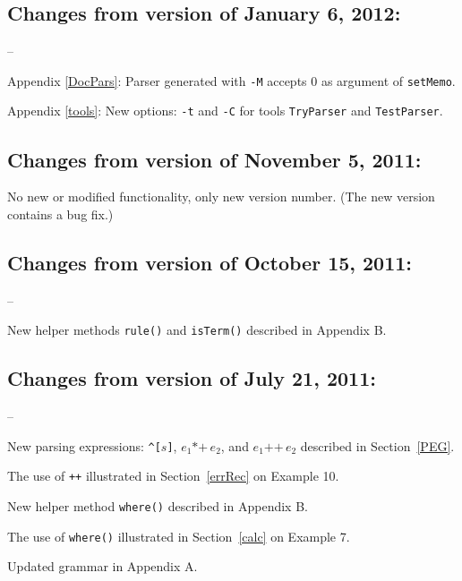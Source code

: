 \documentclass[a4paper,fleqn]{article}
\newcommand{\tx}[1]{\texttt{#1}}
\newcommand{\ul}
{\begin{list}
{--}
 {\setlength{\topsep}{0.5ex}
  \setlength{\itemsep}{0ex}
  \setlength{\parsep}{0ex}
  \setlength{\itemindent}{0em}
  \setlength{\labelwidth}{1em}
  \setlength{\labelsep}{0.5em}
  \setlength{\leftmargin}{1.5em}
 }
}
\newcommand{\eul}{\end{list}}
\begin{document}
\subsection*{Changes from version of January 6, 2012:}
\ul
\item Appendix \ref{DocPars}: Parser generated with \tx{-M} accepts 0 as argument of \tx{setMemo}.
\item Appendix \ref{tools}: New options: \tx{-t} and \tx{-C}
      for tools \tx{TryParser} and \tx{TestParser}.
\eul
\subsection*{Changes from version of November 5, 2011:}
No new or modified functionality, only new version number.
(The new version contains a bug fix.)
\subsection*{Changes from version of October 15, 2011:}
\ul
\item New helper methods \tx{rule()} and \tx{isTerm()} described in Appendix B.
\eul
\subsection*{Changes from version of July 21, 2011:}
\ul
\item New parsing expressions: \tx{\textasciicircum[}$s$\tx{]}, 
      $e_1\tx{*+}\,e_2$, and $e_1\tx{++}\,e_2$  
      described in Section~\ref{PEG}.
\item The use of \tx{++} illustrated in Section~\ref{errRec} on Example 10.
\item New helper method \tx{where()} described in Appendix B.
\item The use of \tx{where()} illustrated in Section~\ref{calc}
      on Example 7.
\item Updated grammar in Appendix A.      
\eul

\newpage
\pagestyle{plain}
\setcounter{page}{1}






\end{document}
